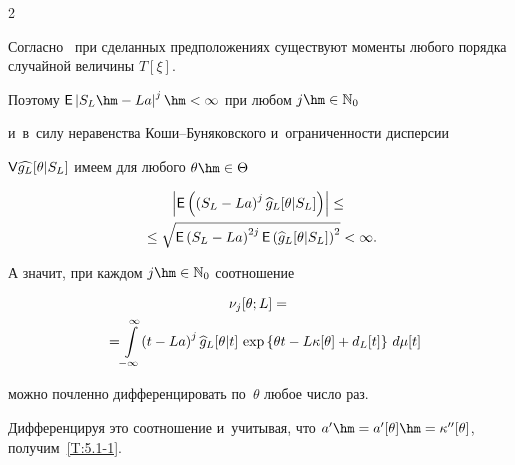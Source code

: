 \begin{multicols}{2}
 \Do


 Согласно~\cite{16-ch} при сделанных предположениях существуют моменты любого порядка случайной величины $T[\xi]$.


 Поэтому $\Ep\left|  S_L\hm - La\right|^{j}\hm<\infty$ при любом $j\hm\in\Np_0$


 и~в~силу неравенства Ко\-ши--Бу\-ня\-ков\-ско\-го и~ограниченности дисперсии


 ${\sf V} \widehat{g_L}[\theta|S_L]$  имеем для любого $\theta\hm\in\Theta$


 \begin{multline*}


\left|\Ep \left(\left( S_L - La\right)^j


  \widehat{g}_{L}[\theta|S_L] \right)\right|\le{}\\


  {}\le


  \sqrt{\Ep \left( S_L - La\right)^{2j} 


  \Ep \left(\widehat{g}_{L}[\theta|S_L]\right)^2}<\infty.


 \end{multline*}


 А значит, при каждом $j\hm\in\Np_0$ соотношение


 \begin{multline*}


  \nu_j[\theta;L]={}\\


  {}=


  \!\int\limits_{-\infty}^\infty \!\left( t - La\right)^j \widehat{g}_{L}[\theta|t]\,


  \exp\left\{\theta t-L\kappa[\theta]+d_L[t]\right\}\,d\mu[t]\hspace*{-4.45374pt}




 \end{multline*}


 можно почленно дифференцировать по~$\theta$ любое число раз.





 Дифференцируя это соотношение и~учитывая, что $a'\hm=a'[\theta]\hm=\kappa''[\theta]$,  получим~\eqref{T:5.1-1}.





\smallskip





\noindent



\end{multicols}
